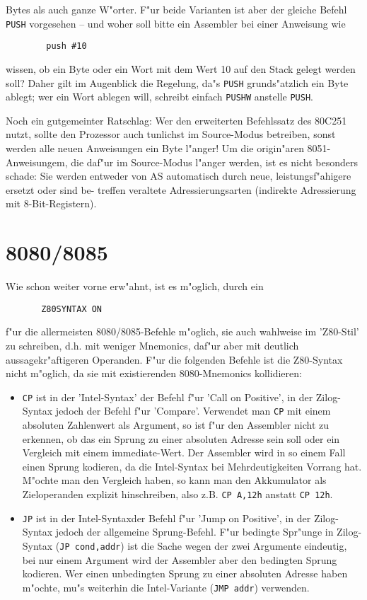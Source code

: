 \documentclass[12pt,a4paper,twoside]{report}
\newcommand{\tty}[1]{{\tt #1}}
\begin{document}
{Bytes als auch ganze W"orter.  F"ur beide Varianten ist aber der gleiche
Befehl \tty{PUSH} vorgesehen -- und woher soll bitte ein Assembler bei
einer Anweisung wie
\begin{verbatim}
        push #10
\end{verbatim}
wissen, ob ein Byte oder ein Wort mit dem Wert 10 auf den Stack gelegt
werden soll?  Daher gilt im Augenblick die Regelung, da"s \tty{PUSH}
grunds"atzlich ein Byte ablegt; wer ein Wort ablegen will, schreibt
einfach \tty{PUSHW} anstelle \tty{PUSH}.
\par
Noch ein gutgemeinter Ratschlag: Wer den erweiterten Befehlssatz des
80C251 nutzt, sollte den Prozessor auch tunlichst im Source-Modus
betreiben, sonst werden alle neuen Anweisungen ein Byte l"anger!  Um
die origin"aren 8051-Anweisungem, die daf"ur im Source-Modus l"anger
werden, ist es nicht besonders schade: Sie werden entweder von AS
automatisch durch neue, leistungsf"ahigere ersetzt oder sind be-
treffen veraltete Adressierungsarten (indirekte Adressierung mit
8-Bit-Registern).


\section{8080/8085}
\label{8080Spec}

Wie schon weiter vorne erw"ahnt, ist es m"oglich, durch ein
\begin{verbatim}
       Z80SYNTAX ON
\end{verbatim}
f"ur die allermeisten 8080/8085-Befehle m"oglich, sie auch wahlweise
im 'Z80-Stil' zu schreiben, d.h. mit weniger Mnemonics, daf"ur aber
mit deutlich aussagekr"aftigeren Operanden.  F"ur die folgenden
Befehle ist die Z80-Syntax nicht m"oglich, da sie mit existierenden
8080-Mnemonics kollidieren:
\begin{itemize}
\item{\tty{CP} ist in der 'Intel-Syntax' der Befehl f"ur 'Call on
      Positive', in der Zilog-Syntax jedoch der Befehl f"ur
      'Compare'.  Verwendet man \tty{CP} mit einem absoluten
      Zahlenwert als Argument, so ist f"ur den Assembler nicht zu
      erkennen, ob das ein Sprung zu einer absoluten Adresse sein
      soll oder ein Vergleich mit einem immediate-Wert.  Der
      Assembler wird in so einem Fall einen Sprung kodieren, da
      die Intel-Syntax bei Mehrdeutigkeiten Vorrang hat.  M"ochte
      man den Vergleich haben, so kann man den Akkumulator als
      Zieloperanden explizit hinschreiben, also z.B. \tty{CP A,12h}
      anstatt \tty{CP 12h}.}
\item{\tty{JP} ist in der Intel-Syntaxder Befehl f"ur 'Jump on
      Positive', in der Zilog-Syntax jedoch der allgemeine
      Sprung-Befehl.  F"ur bedingte Spr"unge in Zilog-Syntax (\tty{JP
      cond,addr}) ist die Sache wegen der zwei Argumente eindeutig,
      bei nur einem Argument wird der Assembler aber den bedingten
      Sprung kodieren.  Wer einen unbedingten Sprung zu einer
      absoluten Adresse haben m"ochte, mu"s weiterhin die
      Intel-Variante (\tty{JMP addr}) verwenden.}
\end{itemize}

}
\end{document}
